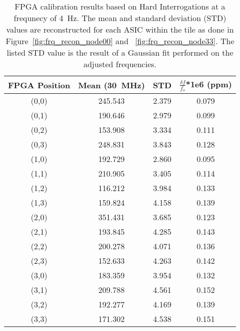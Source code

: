 \begin{table}
	\begin{center}
		\begin{tabular}{|c|c|c|c|}
			\hline
			FPGA Position & Mean (30~\unit{MHz}) & STD & $\frac{\delta f}{f_{o}}$*1e6 (ppm) \\
			\hline
			(0,0) & 245.543 & 2.379 & 0.079 \\
			\hline
			(0,1) & 190.646 & 2.979 & 0.099 \\
			\hline
			(0,2) & 153.908 & 3.334 & 0.111 \\
			\hline
			(0,3) & 248.831 & 3.843 & 0.128 \\
			\hline
			(1,0) & 192.729 & 2.860 & 0.095 \\
			\hline
			(1,1) & 210.905 & 3.405 & 0.114 \\
			\hline
			(1,2) & 116.212 & 3.984 & 0.133 \\
			\hline
			(1,3) & 159.824 & 4.158 & 0.139 \\
			\hline
			(2,0) & 351.431 & 3.685 & 0.123 \\
			\hline
			(2,1) & 193.845 & 4.285 & 0.143 \\
			\hline
			(2,2) & 200.278 & 4.071 & 0.136 \\
			\hline
			(2,3) & 152.633 & 4.263 & 0.142 \\
			\hline
			(3,0) & 183.359 & 3.954 & 0.132 \\
			\hline
			(3,1) & 209.788 & 4.561 & 0.152 \\
			\hline
			(3,2) & 192.277 & 4.169 & 0.139 \\
			\hline
			(3,3) & 171.302 & 4.538 & 0.151 \\
			\hline
		\end{tabular}
	\end{center}
	\caption{FPGA calibration results based on Hard Interrogations at a frequnecy of 4~\unit{Hz}.
	The mean and standard deviation (STD) values are reconstructed for each ASIC within the tile as done in Figure~\ref{fig:frq_recon_node00} and ~\ref{fig:frq_recon_node33}.
	The listed STD value is the result of a Gaussian fit performed on the adjusted frequencies.
	}
	\label{tab:fpga_calibration}
\end{table}